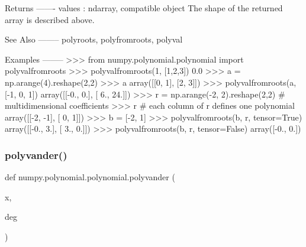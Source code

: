 \begin{DoxyVerb}
Returns
-------
values : ndarray, compatible object
    The shape of the returned array is described above.

See Also
--------
polyroots, polyfromroots, polyval

Examples
--------
>>> from numpy.polynomial.polynomial import polyvalfromroots
>>> polyvalfromroots(1, [1,2,3])
0.0
>>> a = np.arange(4).reshape(2,2)
>>> a
array([[0, 1],
       [2, 3]])
>>> polyvalfromroots(a, [-1, 0, 1])
array([[-0.,   0.],
       [ 6.,  24.]])
>>> r = np.arange(-2, 2).reshape(2,2) # multidimensional coefficients
>>> r # each column of r defines one polynomial
array([[-2, -1],
       [ 0,  1]])
>>> b = [-2, 1]
>>> polyvalfromroots(b, r, tensor=True)
array([[-0.,  3.],
       [ 3., 0.]])
>>> polyvalfromroots(b, r, tensor=False)
array([-0.,  0.])
\end{DoxyVerb}
 \mbox{\label{namespacenumpy_1_1polynomial_1_1polynomial_a3740343c509c52c3d018432609e48640}} 
\subsubsection{\texorpdfstring{polyvander()}{polyvander()}}
{\footnotesize\ttfamily def numpy.\+polynomial.\+polynomial.\+polyvander (\begin{DoxyParamCaption}\item[{}]{x,  }\item[{}]{deg }\end{DoxyParamCaption})}

